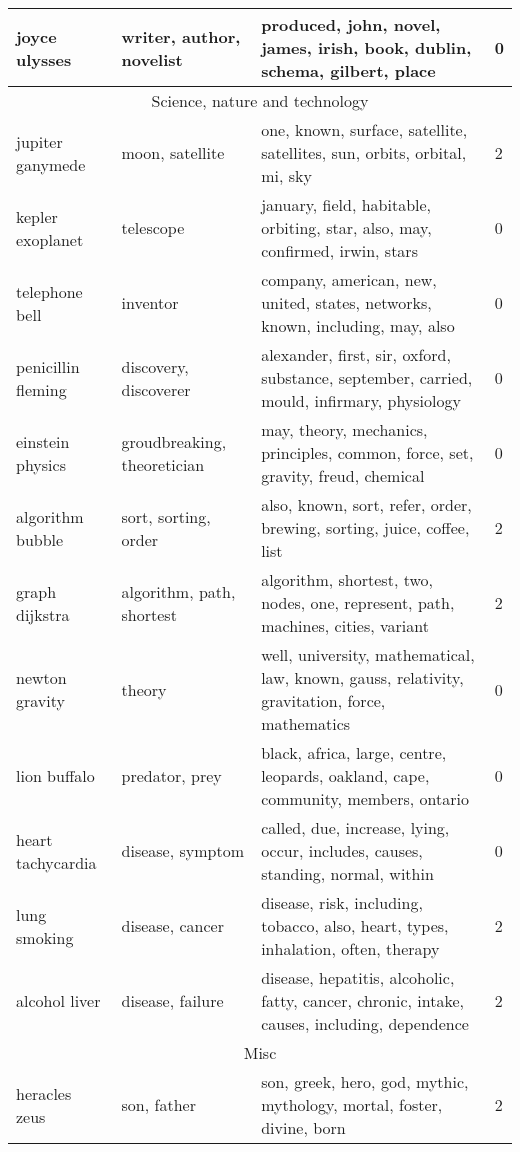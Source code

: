 \documentclass[11pt,a4paper]{article}
\begin{document}
\begin{longtable}[c]{|l|l|p{5cm}|l|}
joyce ulysses  & writer, author, novelist & produced, john, novel, james, irish, book, dublin, schema, gilbert, place & 0 \\ \hline \hline 
\multicolumn{4}{|c|}{Science, nature and technology} \\ \hline 
jupiter ganymede  & moon, satellite & one, known, surface, satellite, satellites, sun, orbits, orbital, mi, sky & 2 \\ \hline 
kepler exoplanet  & telescope & january, field, habitable, orbiting, star, also, may, confirmed, irwin, stars & 0 \\ \hline 
telephone bell  & inventor & company, american, new, united, states, networks, known, including, may, also & 0 \\ \hline 
penicillin fleming  & discovery, discoverer & alexander, first, sir, oxford, substance, september, carried, mould, infirmary, physiology & 0 \\ \hline 
einstein physics  & groudbreaking, theoretician & may, theory, mechanics, principles, common, force, set, gravity, freud, chemical & 0 \\ \hline 
algorithm bubble  & sort, sorting, order & also, known, sort, refer, order, brewing, sorting, juice, coffee, list & 2 \\ \hline 
graph dijkstra  & algorithm, path, shortest & algorithm, shortest, two, nodes, one, represent, path, machines, cities, variant & 2 \\ \hline 
newton gravity  & theory & well, university, mathematical, law, known, gauss, relativity, gravitation, force, mathematics & 0 \\ \hline 
lion buffalo  & predator, prey & black, africa, large, centre, leopards, oakland, cape, community, members, ontario & 0 \\ \hline 
heart tachycardia  & disease, symptom  & called, due, increase, lying, occur, includes, causes, standing, normal, within & 0 \\ \hline 
lung smoking  & disease, cancer & disease, risk, including, tobacco, also, heart, types, inhalation, often, therapy & 2 \\ \hline 
alcohol liver  & disease, failure & disease, hepatitis, alcoholic, fatty, cancer, chronic, intake, causes, including, dependence & 2 \\ \hline \hline 
\multicolumn{4}{|c|}{Misc} \\ \hline 
heracles zeus  & son, father & son, greek, hero, god, mythic, mythology, mortal, foster, divine, born & 2 \\ \hline 

\end{longtable}
\end{document}
